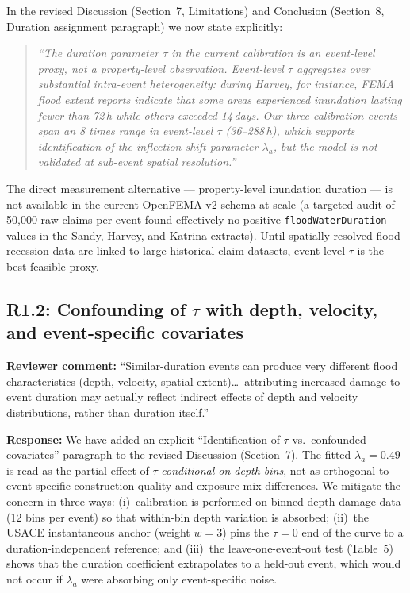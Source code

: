 \documentclass[11pt]{article}
\begin{document}
In the revised Discussion (Section~7, Limitations) and Conclusion (Section~8, Duration assignment paragraph) we now state explicitly:
\begin{quote}
\textit{``The duration parameter $\tau$ in the current calibration is an event-level proxy, not a property-level observation. Event-level $\tau$ aggregates over substantial intra-event heterogeneity: during Harvey, for instance, FEMA flood extent reports indicate that some areas experienced inundation lasting fewer than 72\,h while others exceeded 14\,days. Our three calibration events span an 8 times range in event-level $\tau$ (36--288\,h), which supports identification of the inflection-shift parameter $\lambda_a$, but the model is not validated at sub-event spatial resolution.''}
\end{quote}

The direct measurement alternative --- property-level inundation duration --- is not available in the current OpenFEMA v2 schema at scale (a targeted audit of 50{,}000 raw claims per event found effectively no positive \texttt{floodWaterDuration} values in the Sandy, Harvey, and Katrina extracts). Until spatially resolved flood-recession data are linked to large historical claim datasets, event-level $\tau$ is the best feasible proxy.

\subsection*{R1.2: Confounding of $\tau$ with depth, velocity, and event-specific covariates}

\textbf{Reviewer comment:} ``Similar-duration events can produce very different flood characteristics (depth, velocity, spatial extent)\ldots\ attributing increased damage to event duration may actually reflect indirect effects of depth and velocity distributions, rather than duration itself.''

\textbf{Response:} We have added an explicit ``Identification of $\tau$ vs.\ confounded covariates'' paragraph to the revised Discussion (Section~7). The fitted $\lambda_a = 0.49$ is read as the partial effect of $\tau$ \textit{conditional on depth bins}, not as orthogonal to event-specific construction-quality and exposure-mix differences. We mitigate the concern in three ways: (i)~calibration is performed on binned depth-damage data (12 bins per event) so that within-bin depth variation is absorbed; (ii)~the USACE instantaneous anchor (weight $w = 3$) pins the $\tau = 0$ end of the curve to a duration-independent reference; and (iii)~the leave-one-event-out test (Table~5) shows that the duration coefficient extrapolates to a held-out event, which would not occur if $\lambda_a$ were absorbing only event-specific noise.
\end{document}
